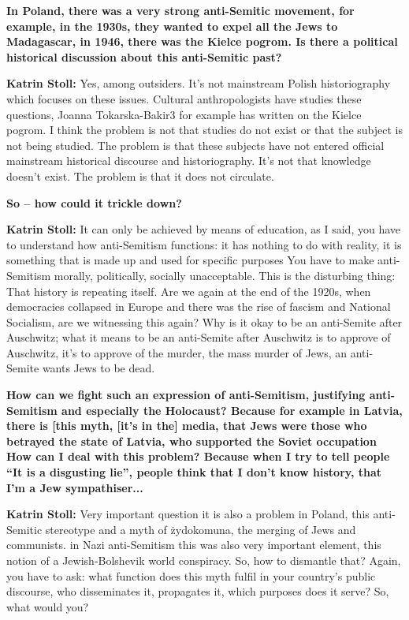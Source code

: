 \textbf{In Poland, there was a very strong anti-Semitic movement, for example, in the 1930s, they wanted to expel all the Jews to Madagascar, in 1946, there was the Kielce pogrom. Is there a political historical discussion about this anti-Semitic past?} 

\textbf{Katrin Stoll:} Yes, among outsiders. It’s not mainstream Polish historiography which focuses on these issues. Cultural anthropologists have studies these questions, Joanna Tokarska-Bakir3 for example has written on the Kielce pogrom. I think the problem is not that studies do not exist or that the subject is not being studied. The problem is that these subjects have not entered official mainstream historical discourse and historiography. It’s not that knowledge doesn’t exist. The problem is that it does not circulate.  

\textbf{So – how could it trickle down?}

\textbf{Katrin Stoll:} It can only be achieved by means of education, as I said, you have to understand how anti-Semitism functions: it has nothing to do with reality, it is something that is made up and used for specific purposes You have to make anti-Semitism morally, politically, socially unacceptable. This is the disturbing thing: That history is repeating itself. Are we again at the end of the 1920s, when democracies collapsed in Europe and there was the rise of fascism and National Socialism, are we witnessing this again?  Why is it okay to be an anti-Semite after Auschwitz; what it means to be an anti-Semite after Auschwitz is to approve of Auschwitz, it’s to approve of the murder, the mass murder of Jews, an anti-Semite wants Jews to be dead.  

\textbf{How can we fight such an expression of anti-Semitism, justifying anti-Semitism and especially the Holocaust? Because for example in Latvia, there is [this myth, [it’s in the] media, that Jews were those who betrayed the state of Latvia, who supported the Soviet occupation How can I deal with this problem? Because when I try to tell people "`It is a disgusting lie"', people think that I don't know history, that I'm a Jew sympathiser...}

\textbf{Katrin Stoll:} Very important question it is also a problem in Poland, this anti-Semitic stereotype and a myth of żydokomuna, the merging of Jews and communists.  in Nazi anti-Semitism this was also very important element, this notion of a Jewish-Bolshevik world conspiracy. So, how to dismantle that? Again, you have to ask: what function does this myth fulfil in your country’s public discourse, who disseminates it, propagates it, which purposes does it serve? So, what would you? 

